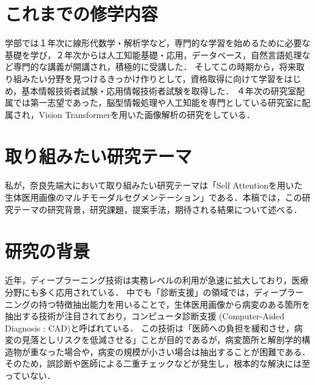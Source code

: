 \documentclass[a4j,10pt,twocolumn]{jarticle}
\begin{document}
\section{これまでの修学内容}
学部では１年次に線形代数学・解析学など，専門的な学習を始めるために必要な基礎を学び，２年次からは人工知能基礎・応用，データベース，自然言語処理など専門的な講義が開講され，積極的に受講した．
そしてこの時期から，将来取り組みたい分野を見つけるきっかけ作りとして，資格取得に向けて学習をはじめ，基本情報技術者試験・応用情報技術者試験を取得した．
４年次の研究室配属では第一志望であった，脳型情報処理や人工知能を専門としている研究室に配属され，Vision Transformerを用いた画像解析の研究をしている．

\section{取り組みたい研究テーマ}
私が，奈良先端大において取り組みたい研究テーマは「Self Attentionを用いた生体医用画像のマルチモーダルセグメンテーション」である．本稿では，この研究テーマの研究背景，研究課題，提案手法，期待される結果について述べる．
\section{研究の背景}
近年，ディープラーニング技術は実務レベルの利用が急速に拡大しており，医療分野にも多く応用されている．
中でも「診断支援」の領域では，ディープラーニングの持つ特徴抽出能力を用いることで，生体医用画像から病変のある箇所を抽出する技術が注目されており，コンピュータ診断支援 (Computer-Aided Diagnosis : CAD)と呼ばれている． 
この技術は「医師への負担を緩和させ，病変の見落としリスクを低減させる」ことが目的であるが，病変箇所と解剖学的構造物が重なった場合や，病変の規模が小さい場合は抽出することが困難である．
そのため，誤診断や医師による二重チェックなどが発生し，根本的な解決には至っていない．
\end{document}
